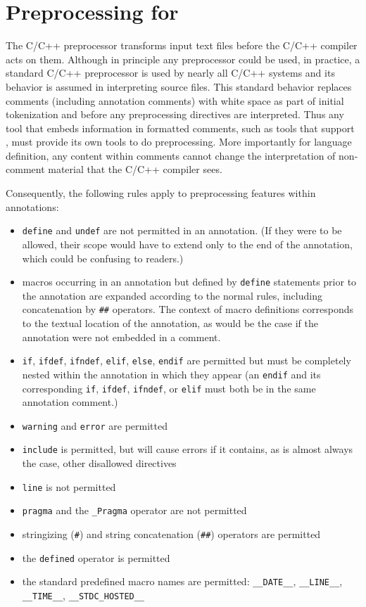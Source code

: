 \section{Preprocessing for \NAME}
\label{sec:ppimpl}

The C/C++ preprocessor transforms input text files before the C/C++ compiler acts on them. 
Although in principle any preprocessor could be used, in practice, a
standard C/C++ preprocessor is used by nearly all C/C++ systems and its behavior is assumed in interpreting source files. 
This standard behavior 
replaces comments (including \NAME annotation comments) with white space as part of initial tokenization and before any preprocessing directives are
interpreted.
Thus any tool that embeds information in formatted comments, such as tools that support \NAME, must provide its own tools to do preprocessing.
More importantly for language definition, any content within comments cannot change the interpretation of non-comment material that the C/C++ compiler sees.

Consequently, the following rules apply to preprocessing features within \NAME annotations:
\begin{itemize}
	\item \texttt{define} and \texttt{undef} are not permitted in an annotation. (If they were to be allowed, their scope would have to extend only to the end of the annotation, which could be confusing to readers.)
	\item macros occurring in an annotation but defined by \texttt{define} statements prior to the annotation are expanded according to the normal rules, including concatenation by \texttt{\#\#} operators. 
	The context of macro definitions corresponds to the textual location of the annotation, as would be the case if the
	annotation were not embedded in a comment.
	\item \texttt{if}, \texttt{ifdef}, \texttt{ifndef}, \texttt{elif}, \texttt{else}, \texttt{endif} are permitted but must be completely nested within the annotation in which they appear (an \texttt{endif} and its corresponding \texttt{if}, \texttt{ifdef}, \texttt{ifndef}, or \texttt{elif} must both be in the same annotation comment.)
	\item \texttt{warning} and \texttt{error} are permitted
	\item \texttt{include} is permitted, but will cause errors if it contains, as is almost always the case, other disallowed directives
	\item \texttt{line} is not permitted
	\item \texttt{pragma} and the \texttt{\_Pragma} operator are not permitted
	\item stringizing (\verb|#|) and string concatenation (\verb|##|) operators are permitted
	\item the \verb|defined| operator is permitted
	\item the standard predefined macro names are permitted: 
	\texttt{\_\_DATE\_\_}, 
	\texttt{\_\_LINE\_\_},
    \texttt{\_\_TIME\_\_},
	\texttt{\_\_STDC\_HOSTED\_\_}
\end{itemize}




